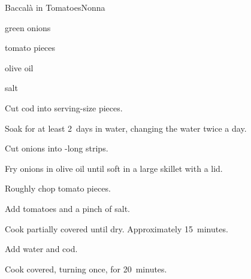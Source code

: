 \begin{recipe}{Baccal\`a in Tomatoes}{Nonna}{}

\begin{ingredients}
\item green onions
\item {}
\item tomato pieces
\item olive oil
\item salt
\end{ingredients}

\begin{directions}
\item Cut cod into serving-size pieces.
\item Soak for at least 2~days in water, changing the water twice a day.
\item Cut onions into -long strips.
\item Fry onions in olive oil until soft in a large skillet with a lid.
\item Roughly chop tomato pieces.
\item Add tomatoes and a pinch of salt.
\item Cook partially covered until dry. Approximately 15~minutes.
\item Add \C{\threequarter} water and cod.
\item Cook covered, turning once, for 20~minutes.
\end{directions}

\end{recipe}
